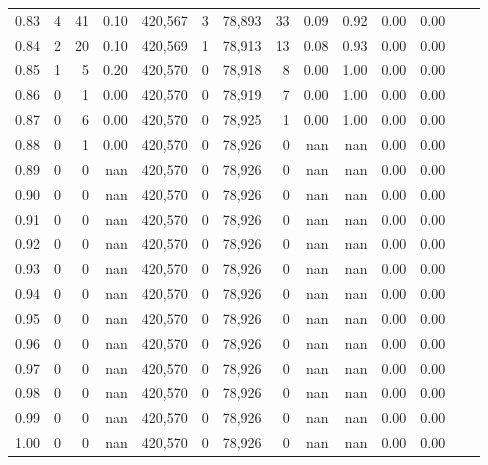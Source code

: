 \begin{tabular}{rrrrrrrrrrrrrr}
0.83 &       4 &     41 &    0.10 &  420,567 &        3 &  78,893 &      33 &  0.09 &  0.92 &  0.00 &      0.00 \\
0.84 &       2 &     20 &    0.10 &  420,569 &        1 &  78,913 &      13 &  0.08 &  0.93 &  0.00 &      0.00 \\
0.85 &       1 &      5 &    0.20 &  420,570 &        0 &  78,918 &       8 &  0.00 &  1.00 &  0.00 &      0.00 \\
0.86 &       0 &      1 &    0.00 &  420,570 &        0 &  78,919 &       7 &  0.00 &  1.00 &  0.00 &      0.00 \\
0.87 &       0 &      6 &    0.00 &  420,570 &        0 &  78,925 &       1 &  0.00 &  1.00 &  0.00 &      0.00 \\
0.88 &       0 &      1 &    0.00 &  420,570 &        0 &  78,926 &       0 &   nan &   nan &  0.00 &      0.00 \\
0.89 &       0 &      0 &     nan &  420,570 &        0 &  78,926 &       0 &   nan &   nan &  0.00 &      0.00 \\
0.90 &       0 &      0 &     nan &  420,570 &        0 &  78,926 &       0 &   nan &   nan &  0.00 &      0.00 \\
0.91 &       0 &      0 &     nan &  420,570 &        0 &  78,926 &       0 &   nan &   nan &  0.00 &      0.00 \\
0.92 &       0 &      0 &     nan &  420,570 &        0 &  78,926 &       0 &   nan &   nan &  0.00 &      0.00 \\
0.93 &       0 &      0 &     nan &  420,570 &        0 &  78,926 &       0 &   nan &   nan &  0.00 &      0.00 \\
0.94 &       0 &      0 &     nan &  420,570 &        0 &  78,926 &       0 &   nan &   nan &  0.00 &      0.00 \\
0.95 &       0 &      0 &     nan &  420,570 &        0 &  78,926 &       0 &   nan &   nan &  0.00 &      0.00 \\
0.96 &       0 &      0 &     nan &  420,570 &        0 &  78,926 &       0 &   nan &   nan &  0.00 &      0.00 \\
0.97 &       0 &      0 &     nan &  420,570 &        0 &  78,926 &       0 &   nan &   nan &  0.00 &      0.00 \\
0.98 &       0 &      0 &     nan &  420,570 &        0 &  78,926 &       0 &   nan &   nan &  0.00 &      0.00 \\
0.99 &       0 &      0 &     nan &  420,570 &        0 &  78,926 &       0 &   nan &   nan &  0.00 &      0.00 \\
1.00 &       0 &      0 &     nan &  420,570 &        0 &  78,926 &       0 &   nan &   nan &  0.00 &      0.00 \\
\bottomrule
\end{tabular}
